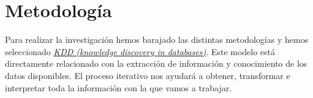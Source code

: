 
\chapter{Metodología}
\label{cap:metodologia}

Para realizar la investigación hemos barajado las distintas metodologías y hemos seleccionado\textit{ \href {http://www.webmining.cl/2011/01/proceso-de-extraccion-de-conocimiento/} {KDD (knowledge discovery in databases)}}. Este modelo está directamente relacionado con la extracción de información y conocimiento de los datos disponibles. El proceso iterativo nos ayudará a obtener, transformar e interpretar toda la información con la que vamos a trabajar.
